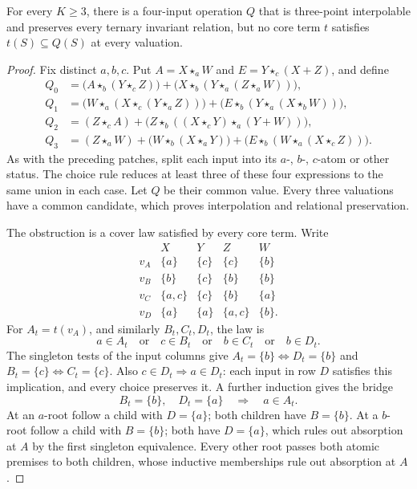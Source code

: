 \begin{theorem}\label{core:thm:no-local-minorant}
For every $K\geq3$, there is a four-input operation $Q$ that is
three-point interpolable and preserves every ternary invariant relation,
but no core term $t$ satisfies $t(S)\subseteq Q(S)$ at every valuation.
\end{theorem}
\begin{proof}
Fix distinct $a,b,c$. Put $A=X\star_aW$ and $E=Y\star_c(X+Z)$, and define
\[
\begin{aligned}
 Q_0&=\bigl(A\star_b(Y\star_cZ)\bigr)
       +\bigl(X\star_b(Y\star_a(Z\star_aW))\bigr),\\
 Q_1&=\bigl(W\star_a(X\star_c(Y\star_aZ))\bigr)
       +\bigl(E\star_b(Y\star_a(X\star_bW))\bigr),\\
 Q_2&=(Z\star_cA)
       +\bigl(Z\star_b((X\star_cY)\star_a(Y+W))\bigr),\\
 Q_3&=(Z\star_aW)+\bigl(W\star_b(X\star_aY)\bigr)
       +\bigl(E\star_b(W\star_a(X\star_cZ))\bigr).
\end{aligned}
\]
As with the preceding patches, split each input into its $a$-, $b$-,
$c$-atom or other status. The choice rule reduces at least three of
these four expressions to the same union in each case. Let $Q$ be
their common value. Every three valuations have a common candidate,
which proves interpolation and relational preservation.

The obstruction is a cover law satisfied by every core term. Write
\[
\begin{array}{c|cccc}
 &X&Y&Z&W\\\hline
 v_A&\{a\}&\{c\}&\{c\}&\{b\}\\
 v_B&\{b\}&\{c\}&\{b\}&\{b\}\\
 v_C&\{a,c\}&\{c\}&\{b\}&\{a\}\\
 v_D&\{a\}&\{a\}&\{a,c\}&\{b\}.
\end{array}
\]
For $A_t=t(v_A)$, and similarly $B_t,C_t,D_t$, the law is
\[
 a\in A_t\quad\text{or}\quad c\in B_t\quad\text{or}\quad
 b\in C_t\quad\text{or}\quad b\in D_t.                 \tag{$*$}
\]
The singleton tests of the input columns give
$A_t=\{b\}\iff D_t=\{b\}$ and
$B_t=\{c\}\iff C_t=\{c\}$. Also $c\in D_t\Rightarrow a\in D_t$:
each input in row $D$ satisfies this implication, and every choice
preserves it. A further induction gives the bridge
\[
 B_t=\{b\},\quad D_t=\{a\}\quad\Longrightarrow\quad a\in A_t.
\]
At an $a$-root follow a child with $D=\{a\}$; both children have
$B=\{b\}$. At a $b$-root follow a child with $B=\{b\}$;
both have $D=\{a\}$, which rules out absorption at $A$ by the first
singleton equivalence. Every other root passes both atomic premises
to both children, whose inductive memberships rule out absorption at $A$.


\end{proof}
